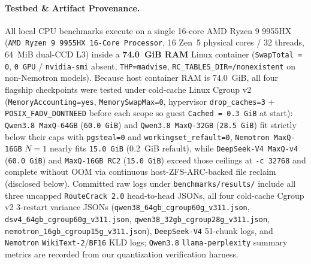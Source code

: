 \documentclass[10pt,twocolumn]{article}
\begin{document}
\paragraph{Testbed \& Artifact Provenance.}
All local CPU benchmarks execute on a single 16-core AMD Ryzen 9 9955HX (\texttt{AMD Ryzen 9 9955HX 16-Core Processor}, 16 Zen~5 physical cores / 32 threads, 64~MiB dual-CCD L3) inside a \textbf{74.0~GiB RAM} Linux container (\texttt{SwapTotal = 0}, \texttt{0 GPU} / \texttt{nvidia-smi} absent, \texttt{THP=madvise}, \texttt{RC\_TABLES\_DIR=/nonexistent} on non-Nemotron models). Because host container RAM is 74.0~GiB, all four flagship checkpoints were tested under cold-cache Linux Cgroup v2 (\texttt{MemoryAccounting=yes}, \texttt{MemorySwapMax=0}, hypervisor \texttt{drop\_caches=3} + \texttt{POSIX\_FADV\_DONTNEED} before each scope so guest \texttt{Cached = 0.3~GiB} at start): \texttt{Qwen3.8 MaxQ-64GB} (\texttt{60.0~GiB}) and \texttt{Qwen3.8 MaxQ-32GB} (\texttt{28.5~GiB}) fit strictly below their caps with \texttt{pgsteal=0} and \texttt{workingset\_refault=0}, \texttt{Nemotron MaxQ-16GB} $N=1$ nearly fits \texttt{15.0~GiB} (0.2~GiB refault), while \texttt{DeepSeek-V4 MaxQ-v4} (\texttt{60.0~GiB}) and \texttt{MaxQ-16GB RC2} (\texttt{15.0~GiB}) exceed those ceilings at \texttt{-c 32768} and complete without OOM via continuous host-ZFS-ARC-backed file reclaim (disclosed below). Committed raw logs under \texttt{benchmarks/results/} include all three uncapped \texttt{RouteCrack 2.0} head-to-head JSONs, all four cold-cache Cgroup v2 3-restart variance JSONs (\texttt{qwen38\_64gb\_cgroup60g\_v311.json}, \texttt{dsv4\_64gb\_cgroup60g\_v311.json}, \texttt{qwen38\_32gb\_cgroup28g\_v311.json}, \texttt{nemotron\_16gb\_cgroup15g\_v311.json}), \texttt{DeepSeek-V4} 51-chunk logs, and \texttt{Nemotron} \texttt{WikiText-2}/\texttt{BF16} KLD logs; \texttt{Qwen3.8} \texttt{llama-perplexity} summary metrics are recorded from our quantization verification harness.
\end{document}
